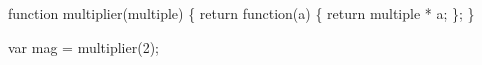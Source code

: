 \begin{minipage}{3in}
  \begin{AVerb}[gobble=4,numbers=left]
    function multiplier(multiple) \{
      return function(a) \{ \label{lang_fig2_js_fun}
        return multiple * a;
      \};
    \}
    
    var mag = multiplier(2); \label{lang_fig2_js_mag}
  \end{AVerb}
\end{minipage}
